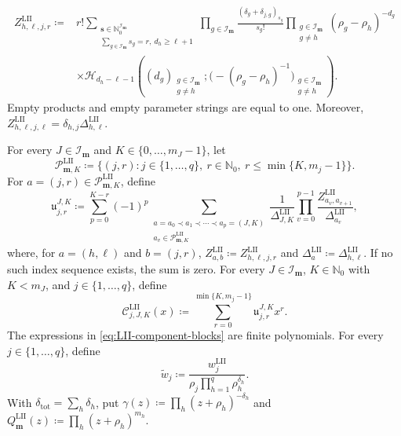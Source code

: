 \documentclass[10pt]{amsart}
\newcommand{\Nzero}{\mathbb N_0}
\newcommand{\mm}{\boldsymbol m}
\theoremstyle{plain}
\theoremstyle{definition}
\theoremstyle{remark}
\begin{document}
\begin{equation}
\begin{split}
 Z_{h,\ell,j,r}^{\mathrm{LII}}
 \coloneq{}&r!\!\!
 \sum_{\substack{\boldsymbol s\in
                  \mathbb N_0^{\mathcal I_{\mm}}\\
                  \sum_{g\in\mathcal I_{\mm}}s_g=r,\ d_h\ge\ell+1}}
 \prod_{g\in\mathcal I_{\mm}}
 \frac{(\delta_g+\delta_{j,g})_{s_g}}{s_g!}
 \prod_{\substack{g\in\mathcal I_{\mm}\\g\ne h}}
 (\rho_g-\rho_h)^{-d_g}
 \\
 &\times
 \mathscr H_{d_h-\ell-1}
 \left(
 (d_g)_{\substack{g\in\mathcal I_{\mm}\\g\ne h}};
 \bigl(-(\rho_g-\rho_h)^{-1}\bigr)_{
       \substack{g\in\mathcal I_{\mm}\\g\ne h}}
 \right).
\end{split}
 \label{eq:LII-component-connection}
\end{equation}
Empty products and empty parameter strings are equal to one. Moreover,
\(Z_{h,\ell,j,\ell}^{\mathrm{LII}}
=\delta_{h,j}\Delta_{h,\ell}^{\mathrm{LII}}\).

For every \(J\in\mathcal I_{\mm}\) and
\(K\in\{0,\ldots,m_J-1\}\), let
\[
 \mathscr P_{\boldsymbol m,K}^{\mathrm{LII}}
 \coloneq\{(j,r):j\in\{1,\ldots,q\},\ r\in\Nzero,\
 r\le\min\{K,m_j-1\}\}.
\]
For \(a=(j,r)\in\mathscr P_{\boldsymbol m,K}^{\mathrm{LII}}\), define
\begin{equation}
 \mathfrak u_{j,r}^{J,K}
 \coloneq\sum_{p=0}^{K-r}(-1)^p
 \sum_{\substack{
 a=a_0\prec a_1\prec\cdots\prec a_p=(J,K)\\
 a_v\in\mathscr P_{\boldsymbol m,K}^{\mathrm{LII}}}}
 \frac1{\Delta_{J,K}^{\mathrm{LII}}}
 \prod_{v=0}^{p-1}
 \frac{Z_{a_v,a_{v+1}}^{\mathrm{LII}}}
 {\Delta_{a_v}^{\mathrm{LII}}},
 \label{eq:LII-component-chain}
\end{equation}
where, for \(a=(h,\ell)\) and \(b=(j,r)\),
\(Z_{a,b}^{\mathrm{LII}}\coloneq Z_{h,\ell,j,r}^{\mathrm{LII}}\) and
\(\Delta_a^{\mathrm{LII}}\coloneq\Delta_{h,\ell}^{\mathrm{LII}}\).
If no such index sequence exists, the sum is zero. For every
\(J\in\mathcal I_{\mm}\), \(K\in\Nzero\) with \(K<m_J\), and
\(j\in\{1,\ldots,q\}\), define
\begin{equation}
 \mathcal C_{j,J,K}^{\mathrm{LII}}(x)
 \coloneq\sum_{r=0}^{\min\{K,m_j-1\}}
 \mathfrak u_{j,r}^{J,K}x^r.
 \label{eq:LII-component-blocks}
\end{equation}
The expressions in \eqref{eq:LII-component-blocks} are finite
polynomials. For every \(j\in\{1,\ldots,q\}\), define
\[
 \widetilde w_j\coloneq
 \frac{w_j^{\mathrm{LII}}}{\rho_j\prod_{h=1}^q\rho_h^{\delta_h}}.
\]
With
\(\delta_{\mathrm{tot}}=\sum_h\delta_h\), put
\(\gamma(z)\coloneq\prod_h(z+\rho_h)^{-\delta_h}\) and
\(Q_{\mm}^{\mathrm{LII}}(z)\coloneq\prod_h(z+\rho_h)^{m_h}\).
\end{document}
